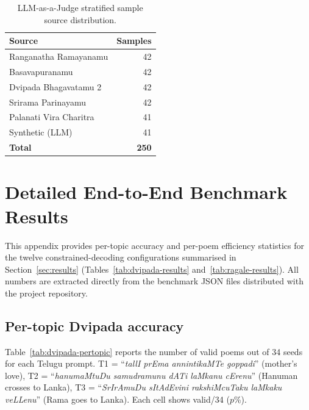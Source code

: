 \documentclass[11pt]{article}
\begin{document}
\begin{table}[H]
\centering
\small
\caption{LLM-as-a-Judge stratified sample source distribution.}
\label{tab:llmjudge_sources}
\begin{tabular}{lr}
\toprule
\textbf{Source} & \textbf{Samples} \\
\midrule
Ranganatha Ramayanamu  & 42 \\
Basavapuranamu         & 42 \\
Dvipada Bhagavatamu 2  & 42 \\
Srirama Parinayamu     & 42 \\
Palanati Vira Charitra & 41 \\
Synthetic (LLM)        & 41 \\
\midrule
\textbf{Total}         & \textbf{250} \\
\bottomrule
\end{tabular}
\end{table}

\section{Detailed End-to-End Benchmark Results}
\label{app:detailed_results}

This appendix provides per-topic accuracy and per-poem efficiency
statistics for the twelve constrained-decoding configurations summarised
in Section~\ref{sec:results} (Tables~\ref{tab:dvipada-results}
and~\ref{tab:ragale-results}). All numbers are extracted directly from
the benchmark JSON files distributed with the project repository.

\subsection{Per-topic Dvipada accuracy}

Table~\ref{tab:dvipada-pertopic} reports the number of valid poems out of
34 seeds for each Telugu prompt. T1 = ``\textit{tallI prEma annintikaMTe
goppadi}'' (mother's love), T2 = ``\textit{hanumaMtuDu samudramunu dATi
laMkanu cErenu}'' (Hanuman crosses to Lanka), T3 =
``\textit{SrIrAmuDu sItAdEvini rakshiMcuTaku laMkaku veLLenu}'' (Rama
goes to Lanka). Each cell shows valid/34 ($p$\%).
\end{document}
